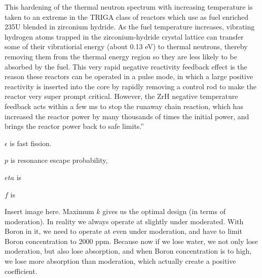 \documentclass{school-22.211-notes}
\begin{document}
This hardening of the thermal neutron spectrum with increasing temperature
is taken to an extreme in the TRIGA class of reactors which use as fuel enriched 235U blended in zirconium hydride. As the fuel temperature increases, vibrating hydrogen atoms trapped in the zirconium-hydride crystal lattice can transfer some
of their vibratiorial energy (about 0.13 eV) to thermal neutrons, thereby removing
them from the thermal energy region so they are less likely to be absorbed by the
fuel. This very rapid negative reactivity feedback effect is the reason these reactors
can be operated in a pulse mode, in which a large positive reactivity is inserted into
the core by rapidly removing a control rod to make the reactor very super prompt
critical. However, the ZrH negative temperature feedback acts within a few ms to
stop the runaway chain reaction, which has increased the reactor power by many
thousands of times the initial power, and brings the reactor power back to safe
limits.'' 


$\epsilon$ is fast fission. 

$p$ is resonance escape probability, 

$eta$ is 

$f$ is


Insert image here. Maximum $k$ gives us the optimal design (in terms of moderation). In reality we always operate at slightly under moderated. With Boron in it, we need to operate at even under moderation, and have to limit Boron concentration to 2000 ppm. Because now if we lose water, we not only lose moderation, but also lose absorption, and when Boron concentration is to high, we lose more absorption than moderation, which actually create a positive coefficient. 
\end{document}
